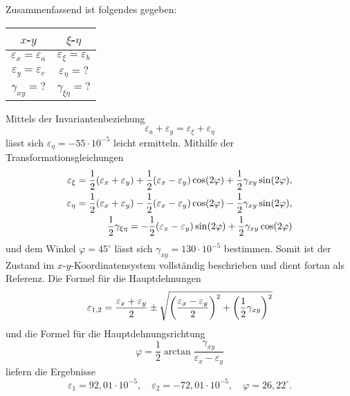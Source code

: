 \documentclass{exercise}
\begin{document}
    Zusammenfassend ist folgendes gegeben:
    \begin{center}
        \begin{tabular}{cc}
            \toprule
            \(x\)-\(y\) & \(\xi\)-\(\eta\)\\
            \midrule
            \(\varepsilon_x = \varepsilon_a\) & \(\varepsilon_\xi = \varepsilon_b\)\\
            \(\varepsilon_y = \varepsilon_c\) & \(\varepsilon_\eta = ?\)\\
            \(\gamma_{xy} = ?\) & \(\gamma_{\xi\eta} = ?\)\\
            \bottomrule
        \end{tabular}
    \end{center}
    Mittels der Invariantenbeziehung
    \[
        \varepsilon_a + \varepsilon_y = \varepsilon_\xi + \varepsilon_\eta
    \]
    lässt sich \(\varepsilon_\eta = -55 \cdot 10^{-5}\) leicht ermitteln.
    Mithilfe der Transformationsgleichungen
    \begin{align*}
        \varepsilon_\xi = \frac{1}{2}\parentheses*{\varepsilon_x + \varepsilon_y} + \frac{1}{2}\parentheses*{\varepsilon_x - \varepsilon_y}\cos\parentheses*{2\varphi} + \frac{1}{2}\gamma_{xy}\sin\parentheses*{2\varphi},\\
        \varepsilon_\eta = \frac{1}{2}\parentheses*{\varepsilon_x + \varepsilon_y} - \frac{1}{2}\parentheses*{\varepsilon_x - \varepsilon_y}\cos\parentheses*{2\varphi} - \frac{1}{2}\gamma_{xy}\sin\parentheses*{2\varphi},\\
        \frac{1}{2}\gamma_{\xi\eta} = -\frac{1}{2}\parentheses*{\varepsilon_x - \varepsilon_y}\sin\parentheses*{2\varphi} + \frac{1}{2}\gamma_{xy}\cos\parentheses*{2\varphi}
    \end{align*}
    und dem Winkel \(\varphi = 45^\circ\) lässt sich \(\gamma_{xy} = 130 \cdot 10^{-5}\) bestimmen.
    Somit ist der Zustand im \(x\)-\(y\)-Koordinatensystem vollständig beschrieben und dient fortan als Referenz.
    Die Formel für die Hauptdehnungen
    \[
        \varepsilon_{1, 2} = \frac{\varepsilon_x + \varepsilon_y}{2} \pm \sqrt{\parentheses*{\frac{\varepsilon_x - \varepsilon_y}{2}}^2 + \parentheses*{\frac{1}{2}\gamma_{xy}}^2}
    \]
    und die Formel für die Hauptdehnungsrichtung
    \[
        \varphi = \frac{1}{2}\arctan\frac{\gamma_{xy}}{\varepsilon_x - \varepsilon_y}
    \]
    liefern die Ergebnisse
    \[
        \varepsilon_1 = 92,01 \cdot 10^{-5}, \quad \varepsilon_2 = -72,01 \cdot 10^{-5}, \quad \varphi = 26,22^\circ.
    \]
\end{document}
